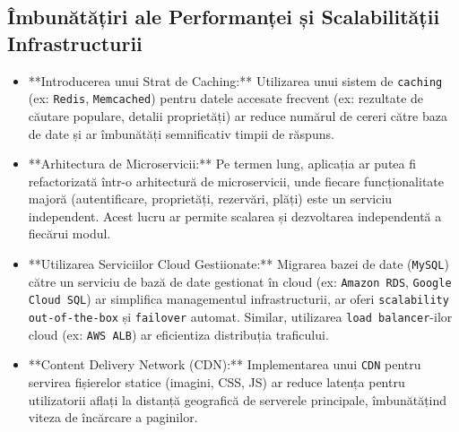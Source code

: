 \documentclass[12pt, a4paper, oneside, romanian]{teza-upb}
\begin{document}
\subsection{Îmbunătățiri ale Performanței și Scalabilității Infrastructurii}
\begin{itemize}
	\item **Introducerea unui Strat de Caching:** Utilizarea unui sistem de \texttt{caching} (ex: \texttt{Redis}, \texttt{Memcached}) pentru datele accesate frecvent (ex: rezultate de căutare populare, detalii proprietăți) ar reduce numărul de cereri către baza de date și ar îmbunătăți semnificativ timpii de răspuns.
	\item **Arhitectura de Microservicii:** Pe termen lung, aplicația ar putea fi refactorizată într-o arhitectură de microservicii, unde fiecare funcționalitate majoră (autentificare, proprietăți, rezervări, plăți) este un serviciu independent. Acest lucru ar permite scalarea și dezvoltarea independentă a fiecărui modul.
	\item **Utilizarea Serviciilor Cloud Gestiionate:** Migrarea bazei de date (\texttt{MySQL}) către un serviciu de bază de date gestionat în cloud (ex: \texttt{Amazon RDS}, \texttt{Google Cloud SQL}) ar simplifica managementul infrastructurii, ar oferi \texttt{scalability out-of-the-box} și \texttt{failover} automat. Similar, utilizarea \texttt{load balancer}-ilor cloud (ex: \texttt{AWS ALB}) ar eficientiza distribuția traficului.
	\item **Content Delivery Network (CDN):** Implementarea unui \texttt{CDN} pentru servirea fișierelor statice (imagini, CSS, JS) ar reduce latența pentru utilizatorii aflați la distanță geografică de serverele principale, îmbunătățind viteza de încărcare a paginilor.
\end{itemize}
\end{document}
